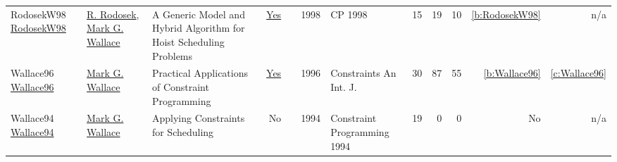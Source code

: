 {\begin{longtable}{>{\raggedright\arraybackslash}p{3cm}>{\raggedright\arraybackslash}p{6cm}>{\raggedright\arraybackslash}p{6.5cm}rrrp{2.5cm}rrrrr}
RodosekW98 \href{https://doi.org/10.1007/3-540-49481-2_28}{RodosekW98} & \hyperref[auth:a299]{R. Rodosek}, \hyperref[auth:a117]{Mark G. Wallace} & A Generic Model and Hybrid Algorithm for Hoist Scheduling Problems & \href{../works/RodosekW98.pdf}{Yes} & \cite{RodosekW98} & 1998 & CP 1998 & 15 & 19 & 10 & \ref{b:RodosekW98} & n/a\\
Wallace96 \href{https://doi.org/10.1007/BF00143881}{Wallace96} & \hyperref[auth:a117]{Mark G. Wallace} & Practical Applications of Constraint Programming & \href{../works/Wallace96.pdf}{Yes} & \cite{Wallace96} & 1996 & Constraints An Int. J. & 30 & 87 & 55 & \ref{b:Wallace96} & \ref{c:Wallace96}\\
Wallace94 \href{}{Wallace94} & \hyperref[auth:a117]{Mark G. Wallace} & Applying Constraints for Scheduling & No & \cite{Wallace94} & 1994 & Constraint Programming 1994 & 19 & 0 & 0 & No & n/a\\
\end{longtable}
}

\clearpage
